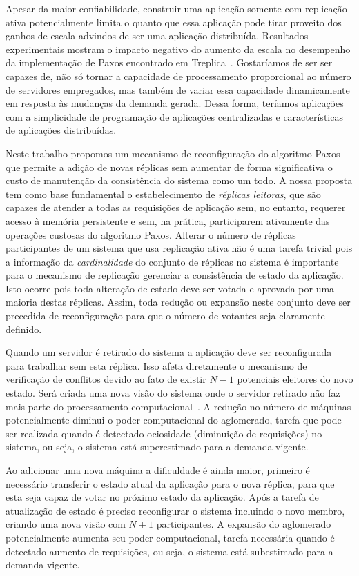 Apesar da maior confiabilidade, construir uma aplicação somente com replicação ativa
potencialmente limita o quanto que essa aplicação pode tirar proveito dos ganhos de escala
advindos de ser uma aplicação distribuída. Resultados experimentais mostram o impacto
negativo do aumento da escala no desempenho da implementação de Paxos encontrado em
Treplica~\cite{vieira09}. Gostaríamos de ser ser capazes de, não só tornar a capacidade de
processamento proporcional ao número de servidores empregados, mas também de variar essa
capacidade dinamicamente em resposta às mudanças da demanda gerada. Dessa forma, teríamos
aplicações com a simplicidade de programação de aplicações centralizadas e características
de aplicações distribuídas.

Neste trabalho propomos um mecanismo de reconfiguração do algoritmo Paxos que permite a
adição de novas réplicas sem aumentar de forma significativa o custo de manutenção da
consistência do sistema como um todo. A nossa proposta tem como base fundamental o
estabelecimento de \emph{réplicas leitoras}, que são capazes de atender a todas as
requisições de aplicação sem, no entanto, requerer acesso à memória persistente e sem,
na prática, participarem ativamente das operações custosas do algoritmo Paxos. Alterar o
número de réplicas participantes de um sistema que usa replicação ativa não é uma tarefa
trivial pois a informação da \emph{cardinalidade} do conjunto de réplicas no sistema é
importante para o mecanismo de replicação gerenciar a consistência de estado da aplicação.
Isto ocorre pois toda alteração de estado deve ser votada e aprovada por uma maioria
destas réplicas. Assim, toda redução ou expansão neste conjunto deve ser precedida de
reconfiguração para que o número de votantes seja claramente definido.

Quando um servidor é retirado do sistema a aplicação deve ser reconfigurada para
trabalhar sem esta réplica. Isso afeta diretamente o mecanismo de verificação de conflitos
devido ao fato de existir $N-1$ potenciais eleitores do novo estado. Será criada uma nova
visão do sistema onde o servidor retirado não faz mais parte do processamento
computacional~\cite{lamport10}. A redução no número de máquinas potencialmente diminui o
poder computacional do aglomerado, tarefa que pode ser realizada quando é detectado
ociosidade (diminuição de requisições) no sistema, ou seja, o sistema está superestimado
para a demanda vigente.

Ao adicionar uma nova máquina a dificuldade é ainda maior, primeiro é necessário
transferir o estado atual da aplicação para o nova réplica, para que esta seja capaz de
votar no próximo estado da  aplicação. Após a tarefa de atualização de estado é preciso
reconfigurar o sistema incluindo o novo membro, criando uma nova visão com $N+1$
participantes. A expansão do aglomerado potencialmente aumenta seu poder computacional,
tarefa necessária quando é  detectado aumento de requisições, ou seja, o sistema está
subestimado para a demanda vigente.

